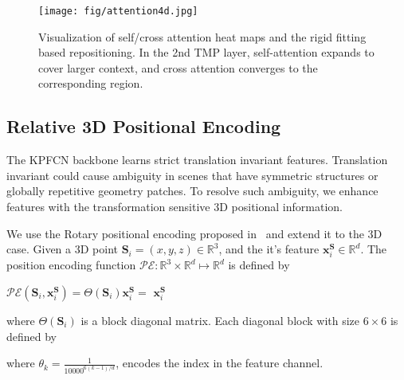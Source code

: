 \begin{figure*}[!t]
    \centering
\texttt{[image: fig/attention4d.jpg]}
\caption{
Visualization of self/cross attention heat maps and the rigid fitting based repositioning.  In the 2nd TMP layer, self-attention expands to cover larger context, and cross attention converges to the corresponding region. 
}
\label{fig:attention4d}
\end{figure*}



\subsection{Relative 3D Positional Encoding}
\label{sec:3d_pe}
The KPFCN backbone learns strict translation invariant features.
Translation invariant could cause ambiguity in scenes that have symmetric structures or globally repetitive geometry patches.
To resolve such ambiguity, we enhance features with the transformation sensitive 3D positional information.

We use the Rotary positional encoding proposed in~\cite{su2021roformer} and extend it to the 3D case.
Given a 3D point $\mathbf{S}_i=(x,y,z)\in \mathbb{R}^3$, 
and the it's feature $\mathbf{x}^{\mathbf{S}}_i\in \mathbb{R}^d$.
The position encoding function $\mathcal{PE}: \mathbb{R}^3 \times \mathbb{R}^d \mapsto  \mathbb{R}^d$ is defined by

\begin{center}
$
\mathcal{PE}(\mathbf{S}_i, \mathbf{x}^\mathbf{ S}_i)=
\Theta(\mathbf{S}_i)  \mathbf{x}^\mathbf{ S}_i=
$
$ \mathbf{x}^\mathbf{ S}_i$
\end{center}
where $\Theta(\mathbf{S}_i)$ is a block diagonal matrix. Each diagonal block with size $6\times 6$ is defined by 
\begin{center}
\scalebox{0.7}{
$
M_k=
\begin{pmatrix}
\cos x\theta_k  & -\sin x\theta_k  &0&0&0&0 \\
\sin x\theta_k  & \cos x\theta_k  &0&0&0&0 \\
0&0&\cos y\theta_k  & -\sin y\theta_k  &0&0\\
0&0&\sin y\theta_k  & \cos y\theta_k  &0&0 \\
0&0&0&0&\cos z\theta_k  & -\sin z\theta_k  \\
0&0&0&0&\sin z\theta_k  & \cos z\theta_k \\
\end{pmatrix} $
}    
\end{center}
where $\theta_k = \frac{1}{10000^{6(k-1)/d}}$, 
\scalebox{0.7}{$k\in [1,2,..,d/6]$} encodes the index in the feature channel.

